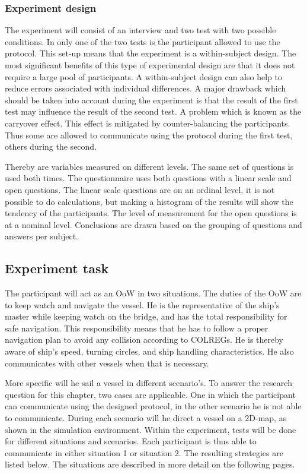 \subsubsection{Experiment design}
The experiment will consist of an interview and two test with two possible conditions. In only one of the two tests is the participant allowed to use the protocol. This set-up means that the experiment is a within-subject design. The most significant benefits of this type of experimental design are that it does not require a large pool of participants. A within-subject design can also help to reduce errors associated with individual differences. A major drawback which should be taken into account during the experiment is that the result of the first test may influence the result of the second test. A problem which is known as the carryover effect. This effect is mitigated by counter-balancing the participants. Thus some are allowed to communicate using the protocol during the first test, others during the second.

Thereby are variables measured on different levels. The same set of questions is used both times. The questionnaire uses both questions with a linear scale and open questions. The linear scale questions are on an ordinal level, it is not possible to do calculations, but making a histogram of the results will show the tendency of the participants. The level of measurement for the open questions is at a nominal level. Conclusions are drawn based on the grouping of questions and answers per subject. 

\subsection{Experiment task}
\label{ssec:experiment-task}
The participant will act as an \acf{OoW} in two situations. The duties of the \ac{OoW} are to keep watch and navigate the vessel. He is the representative of the ship’s master while keeping watch on the bridge, and has the total responsibility for safe navigation. This responsibility means that he has to follow a proper navigation plan to avoid any collision according to COLREGs. He is thereby aware of ship’s speed, turning circles, and ship handling characteristics. He also communicates with other vessels when that is necessary.

More specific will he sail a vessel in different scenario's. To answer the research question for this chapter, two cases are applicable. One in which the participant can communicate using the designed protocol, in the other scenario he is not able to communicate. During each scenario will he direct a vessel on a 2D-map, as shown in the simulation environment.
Within the experiment, tests will be done for different situations and scenarios. Each participant is thus able to communicate in either situation 1 or situation 2. The resulting strategies are listed below. The situations are described in more detail on the following pages.


